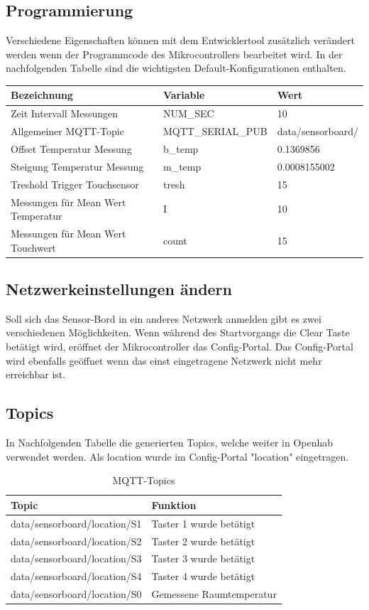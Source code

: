 \subsection{Programmierung}
Verschiedene Eigenschaften können mit dem Entwicklertool zusätzlich verändert werden wenn der Programmcode des Mikrocontrollers bearbeitet wird. In der nachfolgenden Tabelle sind die wichtigsten Default-Konfigurationen enthalten.
\begin{table}[H]
	\centering
	\begin{tabular}{|l|l|l|}
		\hline 
		Bezeichnung & Variable & Wert \\ 
		\hline 
		Zeit Intervall Messungen & NUM\_SEC & 10 \\ 
		\hline 
		Allgemeiner MQTT-Topic  & MQTT\_SERIAL\_PUB& data/sensorboard/ \\ 
		\hline 
		Offset Temperatur Messung & b\_temp & 0.1369856 \\ 
		\hline  
		Steigung Temperatur Messung & m\_temp & 0.0008155002 \\ 
		\hline  
		Treshold Trigger Touchsensor & tresh& 15 \\ 
		\hline
		Messungen für Mean Wert Temperatur & I & 10 \\ 
		\hline  
		Messungen für Mean Wert Touchwert & count & 15 \\ 
		\hline  
	\end{tabular} 	
\end{table}
\subsection{Netzwerkeinstellungen ändern}
Soll sich das Sensor-Bord in ein anderes Netzwerk anmelden gibt es zwei verschiedenen Möglichkeiten. Wenn während des Startvorgangs die Clear Taste betätigt wird, eröffnet der Mikrocontroller das Config-Portal. Das Config-Portal wird ebenfalls geöffnet wenn das einst eingetragene Netzwerk nicht mehr erreichbar ist.

\subsection{Topics}
In Nachfolgenden Tabelle die generierten Topics, welche weiter in Openhab verwendet werden. Als location wurde im Config-Portal "location" eingetragen.
\begin{table}[H]
	\centering
	\begin{tabular}{|l|l|}
		\hline 
		Topic  & Funktion  \\ 
		\hline 
		data/sensorboard/location/S1 & Taster 1 wurde betätigt  \\ 
		\hline
		data/sensorboard/location/S2 & Taster 2 wurde betätigt  \\ 
		\hline
		data/sensorboard/location/S3 & Taster 3 wurde betätigt  \\ 
		\hline
		data/sensorboard/location/S4 & Taster 4 wurde betätigt  \\ 
		\hline
		data/sensorboard/location/S0 & Gemessene Raumtemperatur  \\ 
		\hline
			\end{tabular} 	
	\label{tab: MQTT-Topics Sensor}
	\caption{MQTT-Topics}
\end{table}

